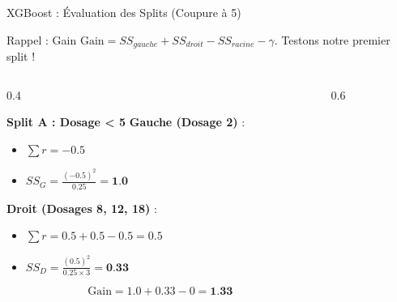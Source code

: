 \begin{frame}{XGBoost : Évaluation des Splits (Coupure à 5)}

    \begin{block}{Rappel : Gain}
        \scriptsize $ \text{Gain} = SS_{gauche} + SS_{droit} - SS_{racine} - \gamma $. Testons notre premier split !
    \end{block}

    \begin{columns}[T]
        \begin{column}{0.4\textwidth}
            \begin{block}{\textbf{Split A : Dosage < 5}}
                \scriptsize
                \textbf{Gauche (Dosage 2)} :
                \begin{itemize}
                    \setlength\itemsep{0em}
                    \item $\sum r = -0.5$
                    \item $SS_{G} = \frac{(-0.5)^2}{0.25} = \textbf{1.0}$
                \end{itemize}
                
                \textbf{Droit (Dosages 8, 12, 18)} :
                \begin{itemize}
                    \setlength\itemsep{0em}
                    \item $\sum r = 0.5 + 0.5 - 0.5 = 0.5$
                    \item $SS_{D} = \frac{(0.5)^2}{0.25 \times 3} = \textbf{0.33}$
                \end{itemize}
                
                $$ \text{Gain} = 1.0 + 0.33 - 0 = \textbf{1.33} $$
            \end{block}
        \end{column}
        
        \begin{column}{0.6\textwidth}
            \begin{center}
\end{center}
\end{column}
\end{columns}
\end{frame}
